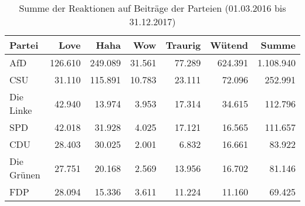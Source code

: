 \begin{table}[ht]
\centering
\caption[Summe der Reaktionen auf Beiträge der Parteien]{Summe der Reaktionen auf Beiträge der Parteien (01.03.2016 bis 31.12.2017)} 
\label{tab_Reactions}
\begin{tabular}{lrrrrrr}
  \hline
Partei & Love & Haha & Wow & Traurig & Wütend & Summe \\ 
  \hline
AfD & 126.610 & 249.089 & 31.561 & 77.289 & 624.391 & 1.108.940 \\ 
  CSU & 31.110 & 115.891 & 10.783 & 23.111 & 72.096 & 252.991 \\ 
  Die Linke & 42.940 & 13.974 & 3.953 & 17.314 & 34.615 & 112.796 \\ 
  SPD & 42.018 & 31.928 & 4.025 & 17.121 & 16.565 & 111.657 \\ 
  CDU & 28.403 & 30.025 & 2.001 & 6.832 & 16.661 & 83.922 \\ 
  Die Grünen & 27.751 & 20.168 & 2.569 & 13.956 & 16.702 & 81.146 \\ 
  FDP & 28.094 & 15.336 & 3.611 & 11.224 & 11.160 & 69.425 \\ 
   \hline
\end{tabular}
\end{table}
